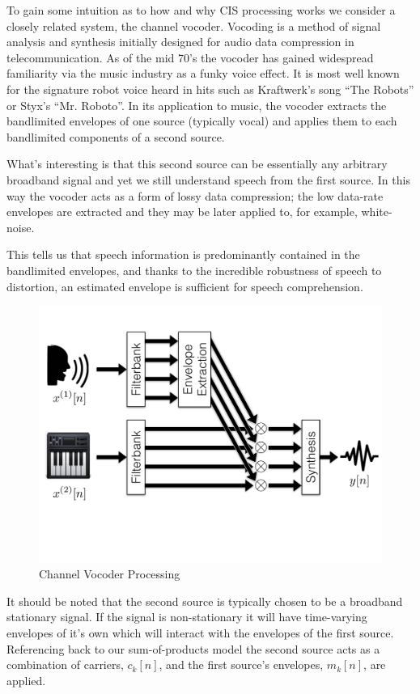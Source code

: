 \documentclass [11pt, proquest,oneside] {uwthesis}[2015/03/03]
\begin{document}
To gain some intuition as to how and why CIS processing works we consider a closely related system, the channel vocoder.  Vocoding is a method of signal analysis and synthesis initially designed for audio data compression in telecommunication.  As of the mid 70's the vocoder has gained widespread familiarity via the music industry as a funky voice effect.  It is most well known for the signature robot voice heard in hits such as Kraftwerk's song ``The Robots'' or Styx's ``Mr. Roboto''.  In its application to music, the vocoder extracts the bandlimited envelopes of one source (typically vocal) and applies them to each bandlimited components of a second source.

What's interesting is that this second source can be essentially any arbitrary broadband signal and yet we still understand speech from the first source.  In this way the vocoder acts as a form of lossy data compression; the low data-rate envelopes are extracted and they may be later applied to, for example, white-noise.

This tells us that speech information is predominantly contained in the bandlimited envelopes, and thanks to the incredible robustness of speech to distortion, an estimated envelope is sufficient for speech comprehension.

\begin{figure}[!ht]
  \centering
    \includegraphics[width=.75\textwidth]{vocoder}   
    \caption{Channel Vocoder Processing}\label{fig:vocoder}
\end{figure}

It should be noted that the second source is typically chosen to be a broadband stationary signal.  If the signal is non-stationary it will have time-varying envelopes of it's own which will interact with the envelopes of the first source. Referencing back to our sum-of-products model the second source acts as a combination of carriers, $c_k[n]$, and the first source's envelopes, $m_k[n]$, are applied.
\end{document}
